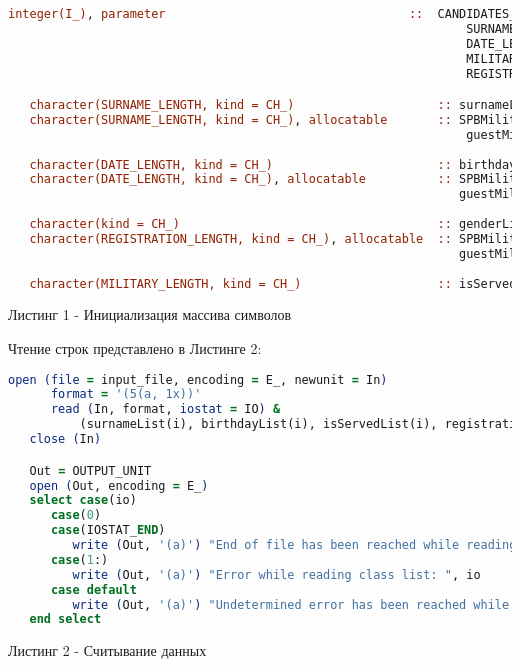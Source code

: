 \documentclass[12pt, a4paper]{report}
\begin{document}
\begin{lstlisting}[language=Fortran]
    integer(I_), parameter                                  ::  CANDIDATES_AMOUNT = 5, & 
                                                                SURNAME_LENGTH = 15, &
                                                                DATE_LENGTH = 4, &
                                                                MILITARY_LENGTH = 3, &
                                                                REGISTRATION_LENGTH = 1

   character(SURNAME_LENGTH, kind = CH_)                    :: surnameList(CANDIDATES_AMOUNT) = ""
   character(SURNAME_LENGTH, kind = CH_), allocatable       :: SPBMilitarySurnameList(:), & 
                                                                guestMilitarySurnameList(:)
                                                           
   character(DATE_LENGTH, kind = CH_)                       :: birthdayList(CANDIDATES_AMOUNT) = ""
   character(DATE_LENGTH, kind = CH_), allocatable          :: SPBMilitaryBirthdayList(:), &
                                                               guestMilitaryBirthdayList(:)
                                                           
   character(kind = CH_)                                    :: genderList(CANDIDATES_AMOUNT) = ""
   character(REGISTRATION_LENGTH, kind = CH_), allocatable  :: SPBMilitaryGenderList(:), &
                                                               guestMilitaryGenderList(:)
   
   character(MILITARY_LENGTH, kind = CH_)                   :: isServedList(CANDIDATES_AMOUNT) = ""

\end{lstlisting}
\begin{center}
Листинг 1 - Инициализация массива символов
\end{center}

Чтение строк представлено в Листинге 2:

\begin{lstlisting}[language=Fortran]
   open (file = input_file, encoding = E_, newunit = In)
      format = '(5(a, 1x))'
      read (In, format, iostat = IO) & 
          (surnameList(i), birthdayList(i), isServedList(i), registrationList(i), genderList(i), i = 1, CANDIDATES_AMOUNT)
   close (In)

   Out = OUTPUT_UNIT
   open (Out, encoding = E_)
   select case(io)
      case(0)
      case(IOSTAT_END)
         write (Out, '(a)') "End of file has been reached while reading class list."
      case(1:)
         write (Out, '(a)') "Error while reading class list: ", io
      case default
         write (Out, '(a)') "Undetermined error has been reached while reading class list: ", io
   end select
\end{lstlisting}
\begin{center}
Листинг 2 - Считывание данных
\end{center}
\end{document}
